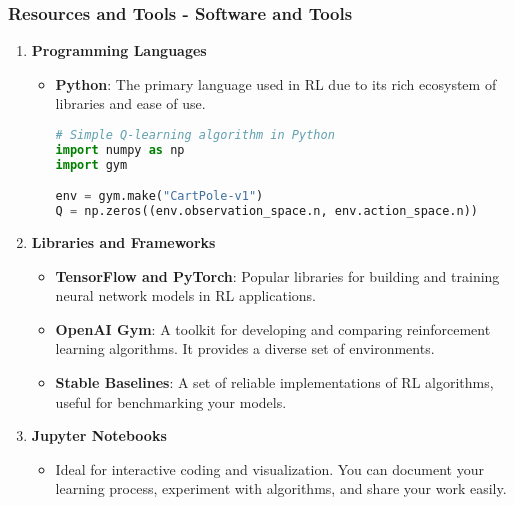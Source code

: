 \documentclass[aspectratio=169]{beamer}
\begin{document}
\begin{frame}[fragile]
    \frametitle{Resources and Tools - Software and Tools}
    \begin{enumerate}
        \item \textbf{Programming Languages}
            \begin{itemize}
                \item \textbf{Python}: The primary language used in RL due to its rich ecosystem of libraries and ease of use.
                    \begin{lstlisting}[language=Python]
# Simple Q-learning algorithm in Python
import numpy as np
import gym

env = gym.make("CartPole-v1")
Q = np.zeros((env.observation_space.n, env.action_space.n))
                    \end{lstlisting}
            \end{itemize}
        \item \textbf{Libraries and Frameworks}
            \begin{itemize}
                \item \textbf{TensorFlow and PyTorch}: Popular libraries for building and training neural network models in RL applications.
                \item \textbf{OpenAI Gym}: A toolkit for developing and comparing reinforcement learning algorithms. It provides a diverse set of environments.
                \item \textbf{Stable Baselines}: A set of reliable implementations of RL algorithms, useful for benchmarking your models.
            \end{itemize}
        \item \textbf{Jupyter Notebooks}
            \begin{itemize}
                \item Ideal for interactive coding and visualization. You can document your learning process, experiment with algorithms, and share your work easily.
            \end{itemize}
    \end{enumerate}
\end{frame}
\end{document}
